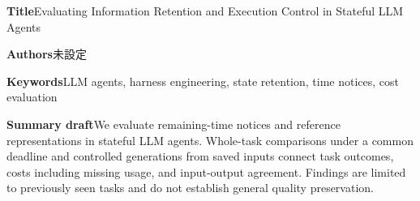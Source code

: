 \documentclass[uplatex,a4paper,twocolumn,10pt]{jsarticle}
\begin{document}
\clearpage
\onecolumn
\noindent\textbf{Title}\quad Evaluating Information Retention and Execution Control in Stateful LLM Agents

\noindent\textbf{Authors}\quad 未設定

\noindent\textbf{Keywords}\quad LLM agents, harness engineering, state retention, time notices, cost evaluation

\noindent\textbf{Summary draft}\quad We evaluate remaining-time notices and reference representations in stateful LLM agents. Whole-task comparisons under a common deadline and controlled generations from saved inputs connect task outcomes, costs including missing usage, and input-output agreement. Findings are limited to previously seen tasks and do not establish general quality preservation.
\end{document}
